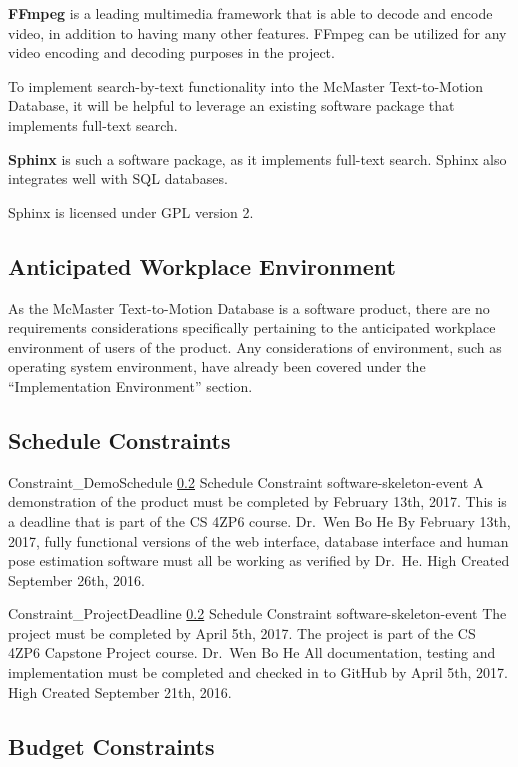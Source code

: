 \documentclass{scrreprt}
\begin{document}
\textbf{FFmpeg} is a leading multimedia framework that is able to decode and
encode video, in addition to having many other features. FFmpeg can be utilized
for any video encoding and decoding purposes in the project.

To implement search-by-text functionality into the McMaster Text-to-Motion
Database, it will be helpful to leverage an existing software package that
implements full-text search.

\textbf{Sphinx} is such a software package, as it implements full-text search.
Sphinx also integrates well with SQL databases.

Sphinx is licensed under GPL version 2.

\subsection{Anticipated Workplace Environment}

As the McMaster Text-to-Motion Database is a software product, there are no
requirements considerations specifically pertaining to the anticipated
workplace environment of users of the product. Any considerations of
environment, such as operating system environment, have already been covered
under the ``Implementation Environment'' section.

\subsection{Schedule Constraints}
\label{req-schedule-constraint}

\requirement
{Constraint_DemoSchedule}
{\ref{req-schedule-constraint} Schedule Constraint }
{software-skeleton-event}
{A demonstration of the product must be completed by February 13th, 2017.}
{This is a deadline that is part of the CS 4ZP6 course.}
{Dr.\ Wen Bo He}
{By February 13th, 2017, fully functional versions of the web interface,
 database interface and human pose estimation software must all be working as
 verified by Dr.\ He.}
{High}
{Created September 26th, 2016.}

\requirement
{Constraint_ProjectDeadline}
{\ref{req-schedule-constraint} Schedule Constraint}
{software-skeleton-event}
{The project must be completed by April 5th, 2017.}
{The project is part of the CS 4ZP6 Capstone Project course.}
{Dr.\ Wen Bo He}
{All documentation, testing and implementation must be completed and checked in
 to GitHub by April 5th, 2017.}
{High}
{Created September 21th, 2016.}

\subsection{Budget Constraints}
\end{document}
